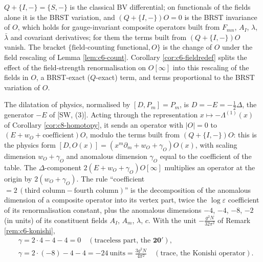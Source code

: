 \begin{remark}
$Q+\{I,-\}=\{S,-\}$ is the classical BV differential; on functionals of the fields alone it is the BRST variation, and $(Q+\{I,-\})O=0$ is the BRST invariance of $O$, which holds for gauge-invariant composite operators built from $F_{mn}$, $A_I$, $\lambda$, $\bar\lambda$ and covariant derivatives; for them the terms built from $(Q+\{I,-\})O$ vanish. The bracket $\{\text{field-counting functional},O\}$ is the change of $O$ under the field rescaling of Lemma \ref{lem:c6-count}. Corollary \ref{cor:c6-fieldredef} splits the effect of the field-strength renormalisation on $O[\infty]$ into this rescaling of the fields in $O$, a BRST-exact ($Q$-exact) term, and terms proportional to the BRST variation of $O$.
\end{remark}

\begin{remark}
The dilatation of physics, normalised by $[D,P_m]=P_m$, is $D=-E=-\tfrac12\Delta$, the generator $-E$ of [SW, (3)]. Acting through the representation $x\mapsto-\Lambda^{(1)}(x)$ of Corollary \ref{cor:c8-homotopy}, it sends an operator with $|O|=0$ to $(E+w_O+\text{coefficient})O$, modulo the terms built from $(Q+\{I,-\})O$: this is the physics form $[D,O(x)]=(x^m\partial_m+w_O+\gamma_O)O(x)$, with scaling dimension $w_O+\gamma_O$ and anomalous dimension $\gamma_O$ equal to the coefficient of the table. The $\Delta$-component $2(E+w_O+\gamma_O)O[\infty]$ multiplies an operator at the origin by $2(w_O+\gamma_O)$. The rule ``coefficient $=2\,(\text{third column}-\text{fourth column})$'' is the decomposition of the anomalous dimension of a composite operator into its vertex part, twice the $\log\varepsilon$ coefficient of its renormalisation constant, plus the anomalous dimensions $-4$, $-4$, $-8$, $-2$ (in units) of its constituent fields $A_I$, $A_m$, $\lambda$, $c$. With the unit $-\frac{g^2N}{32\pi^2}$ of Remark \ref{rem:c6-konishi},
\[
\begin{aligned}&\gamma=2\cdot4-4-4=0\quad(\text{traceless part, the }\mathbf{20'}),\\ &\gamma=2\cdot(-8)-4-4=-24\ \text{units}=\frac{3g^2N}{4\pi^2}\quad(\text{trace, the Konishi operator}).\end{aligned}
\]
\end{remark}

